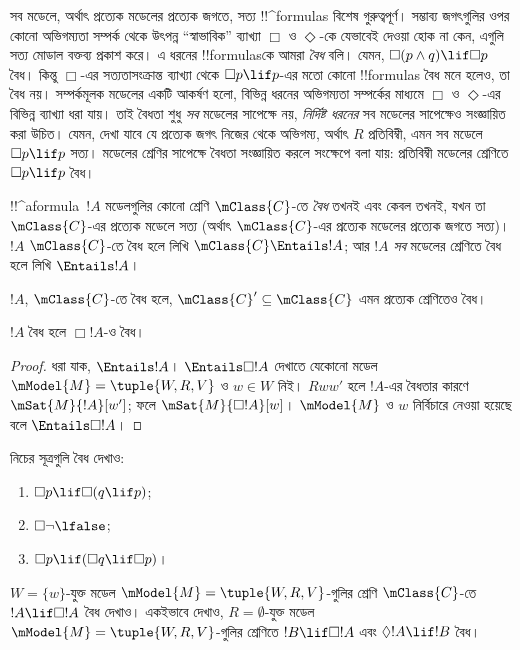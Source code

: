 \documentclass[../../../include/open-logic-section]{subfiles}
\begin{document}


\begin{explain}
  সব মডেলে, অর্থাৎ প্রত্যেক মডেলের প্রত্যেক জগতে, সত্য !!^{formula}s
  বিশেষ গুরুত্বপূর্ণ। সম্ভাব্য জগৎগুলির ওপর কোনো অভিগম্যতা সম্পর্ক থেকে
  উৎপন্ন ``স্বাভাবিক'' ব্যাখ্যা $\Box$ ও $\Diamond$-কে যেভাবেই দেওয়া
  হোক না কেন, এগুলি সত্য মোডাল বক্তব্য প্রকাশ করে। এ ধরনের !!{formula}sকে
  আমরা \emph{বৈধ} বলি। যেমন, $\Box(p \land q) \lif \Box p$ বৈধ। কিন্তু
  $\Box$-এর সত্যতাসংক্রান্ত ব্যাখ্যা থেকে $\Box p \lif p$-এর মতো কোনো
  !!{formula}s বৈধ মনে হলেও, তা বৈধ নয়। সম্পর্কমূলক মডেলের একটি আকর্ষণ
  হলো, বিভিন্ন ধরনের অভিগম্যতা সম্পর্কের মাধ্যমে $\Box$ ও $\Diamond$-এর
  বিভিন্ন ব্যাখ্যা ধরা যায়। তাই বৈধতা শুধু \emph{সব} মডেলের সাপেক্ষে নয়,
  \emph{নির্দিষ্ট ধরনের} সব মডেলের সাপেক্ষেও সংজ্ঞায়িত করা উচিত। যেমন,
  দেখা যাবে যে প্রত্যেক জগৎ নিজের থেকে অভিগম্য, অর্থাৎ $R$ প্রতিবিম্বী,
  এমন সব মডেলে $\Box p \lif p$ সত্য। মডেলের শ্রেণির সাপেক্ষে বৈধতা
  সংজ্ঞায়িত করলে সংক্ষেপে বলা যায়: প্রতিবিম্বী মডেলের শ্রেণিতে
  $\Box p \lif p$ বৈধ।
\end{explain}

\begin{defn}
  !!^a{formula}~$!A$ মডেলগুলির কোনো শ্রেণি $\mClass{C}$-তে \emph{বৈধ}
  তখনই এবং কেবল তখনই, যখন তা $\mClass{C}$-এর প্রত্যেক মডেলে সত্য
  (অর্থাৎ $\mClass{C}$-এর প্রত্যেক মডেলের প্রত্যেক জগতে সত্য)। $!A$
  $\mClass{C}$-তে বৈধ হলে লিখি $\mClass{C} \Entails !A$; আর
  $!A$ \emph{সব} মডেলের শ্রেণিতে বৈধ হলে লিখি $\Entails !A$।
\end{defn}

\begin{prop}
  $!A$, $\mClass{C}$-তে বৈধ হলে, $\mClass{C}' \subseteq \mClass{C}$
  এমন প্রত্যেক শ্রেণিতেও বৈধ।
\end{prop}

\begin{prop}
  $!A$ বৈধ হলে $\Box!A$-ও বৈধ।
\end{prop}

\begin{proof}
  ধরা যাক, $\Entails !A$। $\Entails \Box!A$ দেখাতে যেকোনো মডেল
  $\mModel{M} = \tuple{W, R, V}$ ও $w \in W$ নিই। $Rww'$ হলে
  $!A$-এর বৈধতার কারণে $\mSat{M}{!A}[w']$; ফলে
  $\mSat{M}{\Box!A}[w]$। $\mModel{M}$ ও $w$ নির্বিচারে নেওয়া হয়েছে
  বলে $\Entails \Box!A$।
\end{proof}

\begin{prob}
  নিচের সূত্রগুলি বৈধ দেখাও:
  \begin{enumerate}
  \item $\Box p \lif \Box (q \lif p)$;
  \item $\Box \lnot \lfalse$;
  \item $\Box p \lif (\Box q \lif \Box p)$।
  \end{enumerate}
\end{prob}

\begin{prob}
  $W = \{w\}$-যুক্ত মডেল $\mModel{M} = \tuple{W, R, V}$-গুলির শ্রেণি
  $\mClass{C}$-তে $!A \lif \Box!A$ বৈধ দেখাও। একইভাবে দেখাও,
  $R = \emptyset$-যুক্ত মডেল $\mModel{M} = \tuple{W, R, V}$-গুলির
  শ্রেণিতে $!B \lif \Box !A$ এবং $\Diamond !A \lif !B$ বৈধ।
\end{prob}
\end{document}
